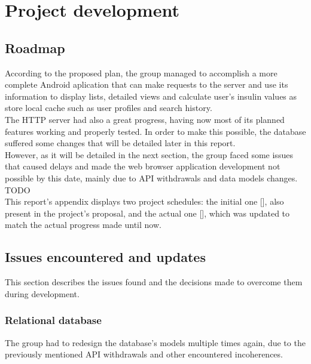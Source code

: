 %
%
\chapter{Project development}
    
	\section{Roadmap}

    According to the proposed plan, the group managed to accomplish a more complete Android aplication 
    that can make requests to the server and use its information to display lists,
    detailed views and calculate user's insulin values as store local cache such as 
    user profiles and search history.\\

    The HTTP server had also a great progress, having now most of its planned features working and properly tested. In order
    to make this possible, the database suffered some changes that will be detailed later in this report.\\

    However, as it will be detailed in the next section, the group faced some issues that caused
    delays and made the web browser application development not possible by this date, mainly due to API
    withdrawals and data models changes.\\

    TODO\\
    This report's appendix displays two project schedules: the initial one [], also present in the
    project's proposal, and the actual one [], which was updated to match the 
    actual progress made until now.

    \section{Issues encountered and updates}

    This section describes the issues found and the decisions made
    to overcome them during development.
    
    \subsection{Relational database}

    The group had to redesign the database's models multiple times again, due to the previously mentioned API withdrawals and other encountered
    incoherences.\\    

